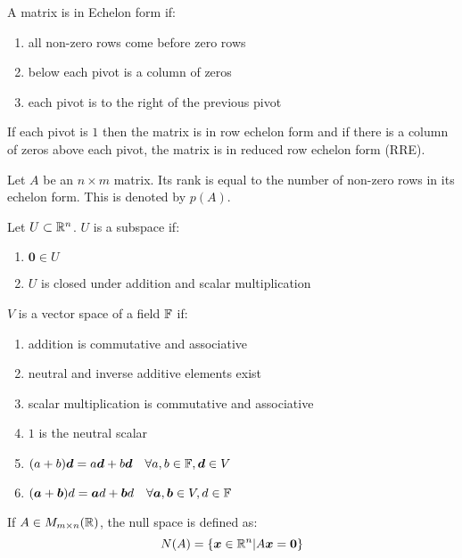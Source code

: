 \documentclass[a4paper,10pt]{article}
\begin{document}
\begin{defn}
	A matrix is in Echelon form if:
	\begin{enumerate}
		\item all non-zero rows come before zero rows
		\item below each pivot is a column of zeros
		\item each pivot is to the right of the previous pivot
	\end{enumerate}

	If each pivot is $1$ then the matrix is in row echelon form and if
	there is a column of zeros above each pivot, the matrix is in reduced
	row echelon form (RRE).
\end{defn}

\begin{defn}[Rank]
	Let $A$ be an $n \times m$ matrix. Its rank is equal to the number of
	non-zero rows in its echelon form. This is denoted by $p(A)$.
\end{defn}

\begin{defn}[Subspace]
	Let $U \subset \mathbb{R}^n$. $U$ is a subspace if:
	\begin{enumerate}
		\item $\bm{0} \in U$
		\item $U$ is closed under addition and scalar multiplication
	\end{enumerate}
\end{defn}

\begin{defn}
	$V$ is a vector space of a field $\mathbb{F}$ if:
	\begin{enumerate}
		\item addition is commutative and associative
		\item neutral and inverse additive elements exist
		\item scalar multiplication is commutative and associative
		\item $1$ is the neutral scalar
		\item $(a+b)\bm{d} = a\bm{d} + b\bm{d} \quad \forall a,b \in \mathbb{F}, \bm{d} \in V$
		\item $(\bm{a} + \bm{b})d = \bm{a}d + \bm{b}d \quad \forall \bm{a},\bm{b} \in V, d \in \mathbb{F}$
	\end{enumerate}
\end{defn}

\begin{defn}
	If $A \in M_{m \times n}(\mathbb{R})$, the null space is defined as:
	\[
		N(A) = \{ \bm{x} \in \mathbb{R}^n | A\bm{x} = \bm{0} \}
	\]
\end{defn}
\end{document}
